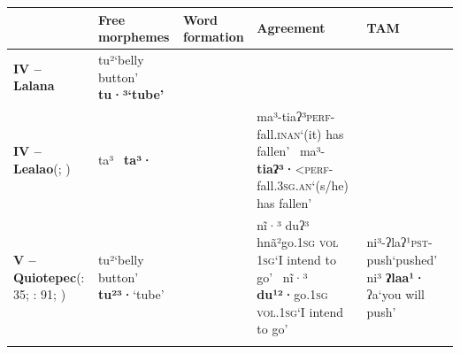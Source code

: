 \documentclass[output=paper]{langscibook}
\begin{document}
\begin{table}
\begin{tabularx}{\textwidth}{p{3.5cm}p{3.5cm}lQp{3cm}}
\lsptoprule
& {\bfseries Free morphemes} & {\bfseries Word formation} & {\bfseries Agreement} & {\bfseries TAM}\\
\midrule
{\bfseries IV – Lalana}
     & { tu²}\newline ‘belly button’\newline~\newline
          \bfseries tu·³\newline ‘tube’
          &
               &
                    & \\
\tablevspace
{\bfseries IV – Lealao}\newline (\citealt{Rensch1968}; \citealt{RuppRupp1996})
     & { ta³}\newline~\newline
          {\bfseries ta³·}
          &
               & ma³-tiaʔ³\newline \textsc{perf}-fall.\textsc{inan}\newline ‘(it) has fallen’\newline~\newline
                ma³-\textbf{tiaʔ³·}\newline \textsc{<perf}-fall.3\textsc{sg.an}\newline ‘(s/he) has fallen’ & \\
\tablevspace
{\bfseries V – Quiotepec}\newline (\citealt{Rensch1989}: 35; \citealt{Robbins1968}: 91; \citealt{GardnerMerrifield1990})
     & { tu²}\newline  ‘belly button’\newline~\newline
      \textbf{tu²³·}\newline  ‘tube’
          &
               & nĩ·³ duʔ³ hnã²\newline go.1\textsc{sg} \textsc{vol} 1\textsc{sg}\newline  ‘I intend to go’\newline~\newline
               nĩ·³ \textbf{du¹²}\textbf{·}\newline go.1\textsc{sg} \textsc{vol}.1\textsc{sg}\newline ‘I intend to go’
                    &  ni³-ʔlaʔ¹\newline \textsc{pst}-push\newline ‘pushed’\newline~\newline
                         ni³ \textbf{ʔlaa¹·} ʔa\newline ‘you will push’\\
     \lspbottomrule
\end{tabularx}
\end{table}
\end{document}
